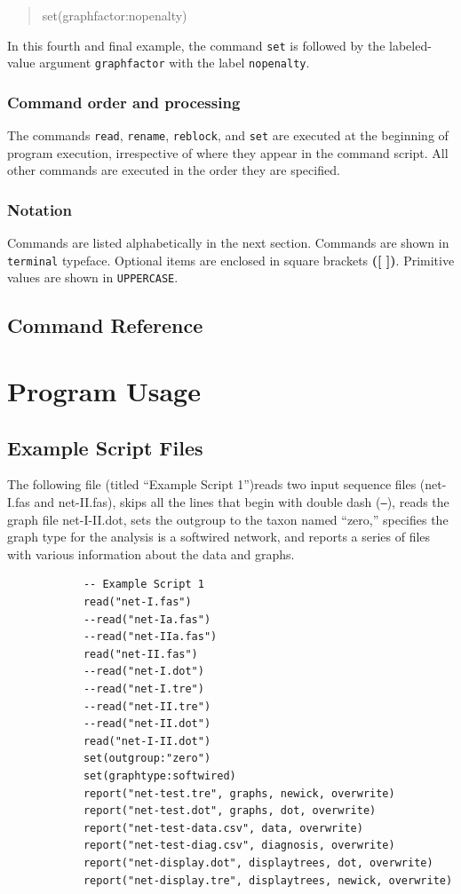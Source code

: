 \documentclass[11pt]{book}
\begin{document}
{{		\begin{quote}
		set(graphfactor:nopenalty) 
		\end{quote}
		
		\noindent In this fourth and final example, the command \texttt{set} is followed by the 
		labeled-value argument \texttt{graphfactor} with the label \texttt{nopenalty}.
				
	\subsection{Command order and processing}
		The commands \texttt{read}, \texttt{rename}, \texttt{reblock}, and \texttt{set} are 
		executed at the beginning of program execution, irrespective of where they appear 
		in the command script. All other commands are executed in the order they are specified. 
		
	\subsection{Notation}
		Commands are listed alphabetically in the next section. Commands are shown in 
		\texttt{terminal} typeface. Optional items are enclosed in square brackets \textbf{([ ])}.
		Primitive values are shown in \texttt{UPPERCASE}. 
	


\section{Command Reference}
	

\chapter{Program Usage}
\section{Example Script Files}
	The following file (titled ``Example Script 1'')reads two input sequence files (net-I.fas and net-II.fas), 
	skips all 	the lines that begin with double dash (\texttt{--}), reads the graph file net-I-II.dot, sets the 
	outgroup to the taxon named ``zero,'' specifies the graph type for the analysis is a softwired network, 
	and 	reports a series of files with various information about the data and graphs.
	
		\begin{verbatim}
			-- Example Script 1
			read("net-I.fas")
			--read("net-Ia.fas")
			--read("net-IIa.fas")
			read("net-II.fas")
			--read("net-I.dot")
			--read("net-I.tre")
			--read("net-II.tre")
			--read("net-II.dot")
			read("net-I-II.dot")
			set(outgroup:"zero")
			set(graphtype:softwired)
			report("net-test.tre", graphs, newick, overwrite)
			report("net-test.dot", graphs, dot, overwrite)
			report("net-test-data.csv", data, overwrite)
			report("net-test-diag.csv", diagnosis, overwrite)
			report("net-display.dot", displaytrees, dot, overwrite)
			report("net-display.tre", displaytrees, newick, overwrite)
		\end{verbatim}
	
}}
\end{document}
